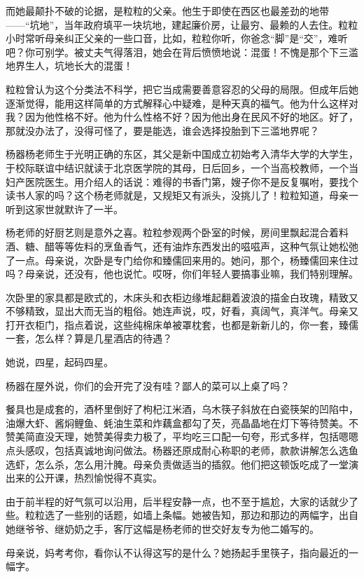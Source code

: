 \documentclass[lang=cn,newtx,12pt,scheme=chinese]{elegantbook}
\begin{document}
而她最颠扑不破的论据，是粒粒的父亲。他生于即使在西区也最差劲的地带——“坑地”，当年政府填平一块坑地，建起廉价房，让最穷、最赖的人去住。粒粒小时常听母亲纠正父亲的一些口音，比如，粒粒你听，你爸念“脚”是“交”，难听吧？你可别学。被丈夫气得落泪，她会在背后愤愤地说：混蛋！不愧是那个下三滥地界生人，坑地长大的混蛋！

粒粒曾认为这个分类法不科学，把它当成需要善意容忍的父母的局限。但成年后她逐渐觉得，能用这样简单的方式解释心中疑难，是种天真的福气。他为什么这样对我？因为他性格不好。他为什么性格不好？因为他出身在民风不好的地区。好了，那就没办法了，没得可怪了，要是能选，谁会选择投胎到下三滥地界呢？

杨器杨老师生于光明正确的东区，其父是新中国成立初始考入清华大学的大学生，于校际联谊中结识就读于北京医学院的其母，日后回乡，一个当高校教师，一个当妇产医院医生。用介绍人的话说：难得的书香门第，嫂子你不是反复嘱咐，要找个读书人家的吗？这个杨老师就是，又规矩又有派头，没挑儿了！粒粒知道，母亲一听到这家世就默许了一半。

杨老师的好厨艺则是意外之喜。粒粒参观两个卧室的时候，房间里飘起混合着料酒、糖、醋等等佐料的烹鱼香气，还有油炸东西发出的嗞嗞声，这种气氛让她松弛了一点。母亲说，次卧是专门给你和臻儒回来用的。她问，那个，杨臻儒回来住过吗？母亲说，还没有，他也说忙。哎呀，你们年轻人要搞事业嘛，我们特别理解。

次卧里的家具都是欧式的，木床头和衣柜边缘堆起翻着波浪的描金白玫瑰，精致又不够精致，显出大而无当的粗俗。她连声说，哎，好看，真阔气，真洋气。母亲又打开衣柜门，指点着说，这些纯棉床单被罩枕套，也都是新新儿的，你一套，臻儒一套，怎么样？算是几星酒店的待遇？

她说，四星，起码四星。

杨器在屋外说，你们的会开完了没有哇？鄙人的菜可以上桌了吗？

餐具也是成套的，酒杯里倒好了枸杞江米酒，乌木筷子斜放在白瓷筷架的凹陷中，油爆大虾、酱焖鲤鱼、蚝油生菜和炸藕盒都勾了芡，亮晶晶地在灯下等待赞美。不赞美简直没天理，她赞美得卖力极了，平均吃三口配一句夸，形式多样，包括嗯嗯点头感叹，包括真诚地询问做法。杨器还原成耐心称职的老师，款款讲解怎么选鱼选虾，怎么杀，怎么用汁腌。母亲负责做适当的插叙。他们把这顿饭吃成了一堂演出来的公开课，热烈愉悦得不真实。

由于前半程的好气氛可以沿用，后半程安静一点，也不至于尴尬，大家的话就少了些。粒粒选了一些别的话题，如墙上条幅。她被告知，那边和那边的两幅字，出自她继爷爷、继奶奶之手，客厅这幅是杨老师的世交好友专为他二婚写的。

母亲说，妈考考你，看你认不认得这写的是什么？她扬起手里筷子，指向最近的一幅字。
\end{document}
